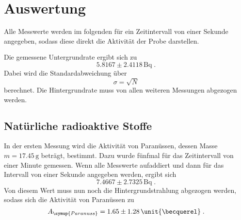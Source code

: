 \section{Auswertung}
\label{sec:Auswertung}

%
Alle Messwerte werden im folgenden für ein Zeitintervall von einer Sekunde angegeben, sodass diese direkt die Aktivität der Probe darstellen.

Die gemessene Untergrundrate ergibt sich zu
\begin{equation*}
    5.8167 \pm 2.4118 \,\unit{\becquerel} \; .
\end{equation*}
Dabei wird die Standardabweichung über 
\begin{equation}
    \sigma = \sqrt{N}
    \label{eqn:standardabweichung}
\end{equation}
berechnet. 
Die Hintergrundrate muss von allen weiteren Messungen abgezogen werden.

\subsection{Natürliche radioaktive Stoffe}
In der ersten Messung wird die Aktivität von Paranüssen, dessen Masse $m = 17.45 \, \unit{\gram}$ beträgt, bestimmt. Dazu wurde fünfmal für das Zeitintervall 
von einer Minute gemessen. Wenn alle Messwerte aufaddiert und dann für das Intervall von einer Sekunde angegeben werden, ergibt sich 
\begin{equation*}
    7.4667 \pm 2.7325 \, \unit{\becquerel} \; .
\end{equation*}
Von diesem  Wert muss nun noch die Hintergrundstrahlung abgezogen werden, sodass sich die Aktivität von Paranüssen zu 
\begin{equation*}
    A_{\symup{Paranuss}} = 1.65 \pm 1.28 \, \unit{\becquerel} \; . 
\end{equation*}
